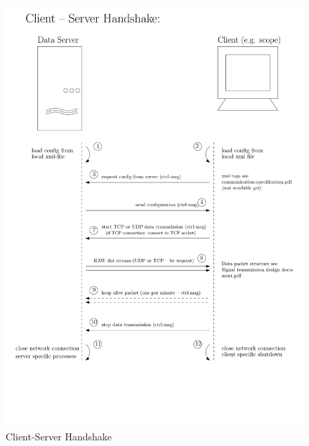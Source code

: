 \documentclass[11pt]{scrartcl}
\begin{document}
    \begin{figure}
      \centering
        \includegraphics[scale=0.7]{Client-Server-Handshake.pdf}
      \caption{Client-Server Handshake}
      \label{fig:handshake}
    \end{figure}
\end{document}
